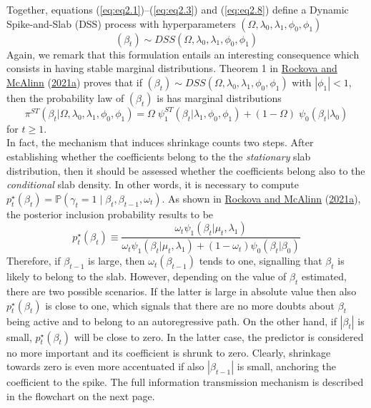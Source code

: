 \documentclass[
  12pt,
]{book}
\theoremstyle{break}
\theoremstyle{nonumberplain}
\begin{document}
Together, equations (\ref{eq:eq2.1})--(\ref{eq:eq2.3}) and
(\ref{eq:eq2.8}) define a Dynamic Spike-and-Slab (DSS) process with
hyperparameters \((\Omega,\lambda_{0},\lambda_{1},\phi_{0},\phi_{1})\)
\begin{equation}
(\beta_{t})\sim DSS(\Omega,\lambda_{0},\lambda_{1},\phi_{0},\phi_{1})
\end{equation} Again, we remark that this formulation entails an
interesting consequence which consists in having stable marginal
distributions. Theorem 1 in
\protect\hyperlink{ref-rockova_mcalinn_2021}{Rockova and McAlinn}
(\protect\hyperlink{ref-rockova_mcalinn_2021}{2021a}) proves that if
\((\beta_{t})\sim DSS(\Omega,\lambda_{0},\lambda_{1},\phi_{0},\phi_{1})\)
with \(|\phi_1|<1\), then the probability law of \((\beta_{t})\) is has
marginal distributions \begin{equation}\label{eq:eq5.5}
\pi^{ST}(\beta_{t}|\Omega,\lambda_{0},\lambda_{1},\phi_{0},\phi_{1}) = \Omega \; \psi_{1}^{ST}(\beta_{t}|\lambda_{1},\phi_{0},\phi_{1})+(1-\Omega)\; \psi_{0}(\beta_{t}|\lambda_{0})
\end{equation} for \(t\geq 1\).\\
In fact, the mechanism that induces shrinkage counts two steps. After
establishing whether the coefficients belong to the the
\emph{stationary} slab distribution, then it should be assessed whether
the coefficients belong also to the \emph{conditional} slab density. In
other words, it is necessary to compute
\(p^{\star}_t(\beta_t)=\mathbb{P}(\gamma_t=1\mid \beta_t,\beta_{t-1},\omega_t)\).
As shown in \protect\hyperlink{ref-rockova_mcalinn_2021}{Rockova and
McAlinn} (\protect\hyperlink{ref-rockova_mcalinn_2021}{2021a}), the
posterior inclusion probability results to be
\begin{equation}\label{eq:pstar}
p_{t}^{\star}(\beta_{t})\equiv \frac{\omega_{t}\psi_{1}(\beta_{t}|\mu_{t},\lambda_{1})}{\omega_{t}\psi_{1}(\beta_{t}|\mu_{t},\lambda_{1})+(1-\omega_{t})\psi_{0}(\beta_{t}|\beta_{0})}
\end{equation} Therefore, if \(\beta_{t-1}\) is large, then
\(\omega_t(\beta_{t-1})\) tends to one, signalling that \(\beta_{t}\) is
likely to belong to the slab. However, depending on the value of
\(\beta_{t}\) estimated, there are two possible scenarios. If the latter
is large in absolute value then also \(p^{\star}_t(\beta_t)\) is close
to one, which signals that there are no more doubts about \(\beta_{t}\)
being active and to belong to an autoregressive path. On the other hand,
if \(|\beta_{t}|\) is small, \(p^{\star}_t(\beta_t)\) will be close to
zero. In the latter case, the predictor is considered no more important
and its coefficient is shrunk to zero. Clearly, shrinkage towards zero
is even more accentuated if also \(|\beta_{t-1}|\) is small, anchoring
the coefficient to the spike. The full information transmission
mechanism is described in the flowchart on the next page.
\end{document}
